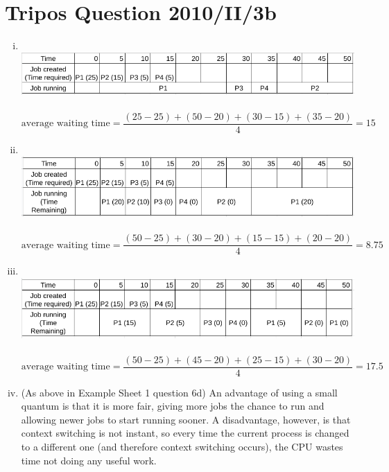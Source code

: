 \documentclass[12pt]{article}
\begin{document}
\section{Tripos Question 2010/II/3b}
\begin{enumerate}[(i)]
    \item \(\)\\ \includegraphics[scale=0.5]{3-sjf.png}\\\\
          $\text{average waiting time} = \dfrac{(25 - 25) + (50 - 20) + (30 - 15) + (35 - 20)}{4} = 15$
    \item \(\)\\ \includegraphics[scale=0.5]{3-srtf.png}\\\\
          $\text{average waiting time} = \dfrac{(50 - 25) + (30 - 20) + (15 - 15) + (20 - 20)}{4} = 8.75$
    \item \(\)\\ \includegraphics[scale=0.5]{3-rr.png}\\\\
          $\text{average waiting time} = \dfrac{(50 - 25) + (45 - 20) + (25 - 15) + (30 - 20)}{4} = 17.5$
    \item (As above in Example Sheet 1 question 6d) An advantage of using a small quantum is that it is more fair, giving more jobs the chance to run and allowing newer jobs to start running sooner. A disadvantage, however, is that context switching is not instant, so every time the current process is changed to a different one (and therefore context switching occurs), the CPU wastes time not doing any useful work.
\end{enumerate}
\end{document}
